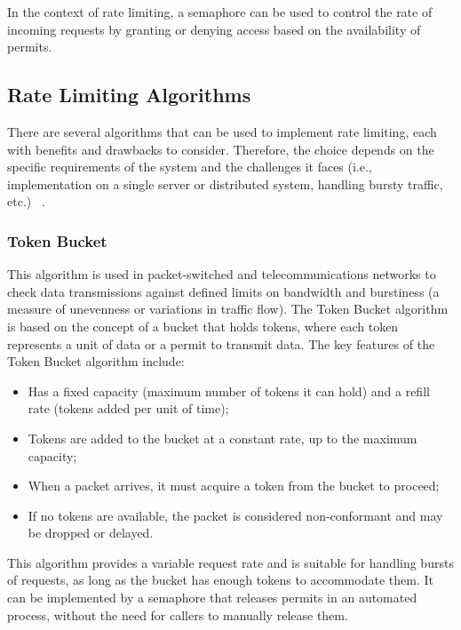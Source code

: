 In the context of rate limiting, a semaphore can be used to control the rate of incoming requests by granting or denying access based on the availability of permits.

\subsection{Rate Limiting Algorithms}\label{subsec:rate-limiter-algorithms}

There are several algorithms that can be used to implement rate limiting, each with benefits and drawbacks to consider.
Therefore, the choice depends on the specific requirements of the system and the challenges it faces
(i.e., implementation on a single server or distributed system, handling bursty traffic, etc.)
~\cite{medium-rate-limiting-algorithms,nordic-apis-rate-limiting-algorithms}.

\subsubsection{Token Bucket}\label{subsubsec:token-bucket-algorithm}

This algorithm is used in packet-switched and telecommunications networks
to check data transmissions against defined limits on bandwidth and burstiness
(a measure of unevenness or variations in traffic flow).
The Token Bucket algorithm is based on the concept of a bucket that holds tokens,
where each token represents a unit of data or a permit to transmit data.
The key features of the Token Bucket algorithm include:

\begin{itemize}
    \item Has a fixed capacity (maximum number of tokens it can hold) and a refill rate (tokens added per unit of time);
    \item Tokens are added to the bucket at a constant rate, up to the maximum capacity;
    \item When a packet arrives, it must acquire a token from the bucket to proceed;
    \item If no tokens are available, the packet is considered non-conformant and may be dropped or delayed.
\end{itemize}

This algorithm provides a variable request rate and is suitable for handling bursts of requests,
as long as the bucket has enough tokens to accommodate them.
It can be implemented by a semaphore that releases permits in an automated process,
without the need for callers to manually release them.

